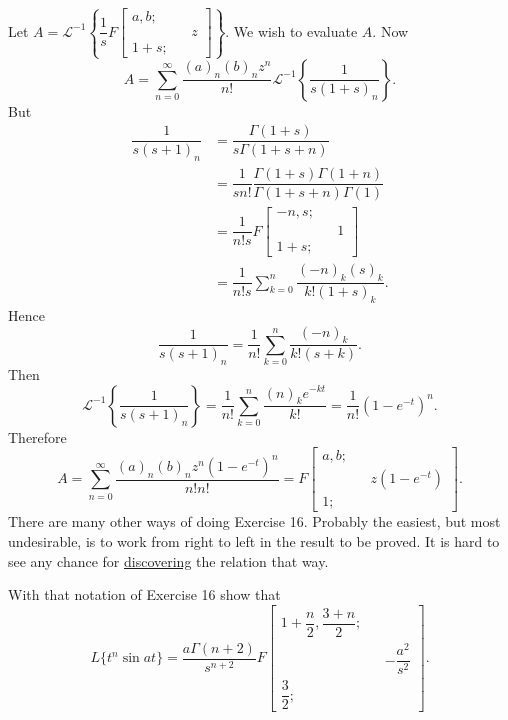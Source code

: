 \begin{solution}
Let $A = \mathscr{L}^{-1} \left\{ \dfrac{1}{s} F \left[ \begin{array}{rlr}
a,b; & & \\
& & z \\
1+s;
\end{array} \right] \right\}.$ We wish to evaluate $A$. Now
$$A = \displaystyle\sum_{n=0}^{\infty} \dfrac{(a)_n (b)_n z^n}{n!} \mathscr{L}^{-1} \left\{ \dfrac{1}{s(1+s)_n} \right\}.$$
But
$$\begin{array}{ll}
\dfrac{1}{s(s+1)_n} &= \dfrac{\Gamma(1+s)}{s \Gamma(1+s+n)} \\
&= \dfrac{1}{s n!} \dfrac{\Gamma(1+s) \Gamma(1+n)}{\Gamma(1+s+n) \Gamma(1)} \\
&= \dfrac{1}{n!s} F \left[ \begin{array}{rlr}
-n, s; & & \\
& & 1 \\
1+s; & & 
\end{array} \right] \\
&= \dfrac{1}{n!s} \displaystyle\sum_{k=0}^n \dfrac{(-n)_k (s)_k}{k! (1+s)_k}.
\end{array}$$
Hence
$$\dfrac{1}{s(s+1)_n} = \dfrac{1}{n!} \displaystyle\sum_{k=0}^n \dfrac{(-n)_k}{k!(s+k)}.$$
Then
$$\mathscr{L}^{-1} \left\{ \dfrac{1}{s(s+1)_n} \right\} = \dfrac{1}{n!} \displaystyle\sum_{k=0}^n \dfrac{(n)_k e^{-kt}}{k!} = \dfrac{1}{n!} (1 - e^{-t})^n.$$
Therefore
$$A = \displaystyle\sum_{n=0}^{\infty} \dfrac{(a)_n (b)_n z^n (1-e^{-t})^n}{n! n!} = F \left[ \begin{array}{rlr}
a,b; & & \\
& & z(1-e^{-t}) \\
1; & & 
\end{array} \right].$$
There are many other ways of doing Exercise 16. Probably the easiest, but most undesirable, is to work from right to left in the result to be proved. It is hard to see any chance for \underline{discovering} the relation that way.
\end{solution}
\begin{problem}\label{problem17chapter4}
With that notation of Exercise 16 show that
$$L \{t^n \sin at\} = \dfrac{a \Gamma(n+2)}{s^{n+2}} F \left[ \begin{array}{rlr}
1 + \dfrac{n}{2}, \dfrac{3+n}{2}; & & \\
& & -\dfrac{a^2}{s^2} \\
\dfrac{3}{2}; 
\end{array} \right].$$
\end{problem}
